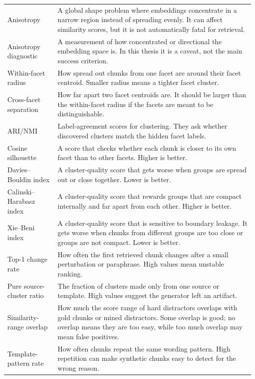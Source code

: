 \documentclass[11pt,a4paper]{article}
\begin{document}
\begin{longtable}{@{}p{4.0cm}p{10.0cm}@{}}
	Anisotropy & A global shape problem where embeddings concentrate in a narrow region instead of spreading evenly. It can affect similarity scores, but it is not automatically fatal for retrieval. \\
	Anisotropy diagnostic & A measurement of how concentrated or directional the embedding space is. In this thesis it is a caveat, not the main success criterion. \\
	Within-facet radius & How spread out chunks from one facet are around their facet centroid. Smaller radius means a tighter facet cluster. \\
	Cross-facet separation & How far apart two facet centroids are. It should be larger than the within-facet radius if the facets are meant to be distinguishable. \\
	ARI/NMI & Label-agreement scores for clustering. They ask whether discovered clusters match the hidden facet labels. \\
	Cosine silhouette & A score that checks whether each chunk is closer to its own facet than to other facets. Higher is better. \\
	Davies--Bouldin index & A cluster-quality score that gets worse when groups are spread out or close together. Lower is better. \\
	Calinski--Harabasz index & A cluster-quality score that rewards groups that are compact internally and far apart from each other. Higher is better. \\
	Xie--Beni index & A cluster-quality score that is sensitive to boundary leakage. It gets worse when chunks from different groups are too close or groups are not compact. Lower is better. \\
	Top-1 change rate & How often the first retrieved chunk changes after a small perturbation or paraphrase. High values mean unstable ranking. \\
	Pure source-cluster ratio & The fraction of clusters made only from one source or template. High values suggest the generator left an artifact. \\
	Similarity-range overlap & How much the score range of hard distractors overlaps with gold chunks or mined distractors. Some overlap is good; no overlap means they are too easy, while too much overlap may mean false positives. \\
	Template-pattern rate & How often chunks repeat the same wording pattern. High repetition can make synthetic chunks easy to detect for the wrong reason. \\
\end{longtable}
\endgroup
\end{document}
